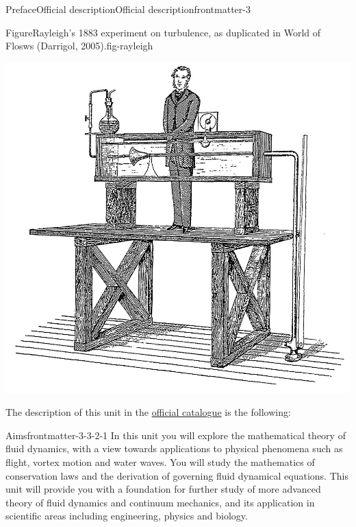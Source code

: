 \documentclass[oneside,10pt,]{book}
\numberwithin{equation}{section}
\begin{document}
\begin{preface}{Preface}{Official description}{}{Official description}{}{}{frontmatter-3}
\begin{figureptx}{Figure}{Rayleigh's 1883 experiment on turbulence, as duplicated in World of Flosws (Darrigol, 2005).}{fig-rayleigh}{}%
\begin{image}{0.1}{0.8}{0.1}{}%
\includegraphics[width=\linewidth]{external/rayleigh_tubulence.jpg}
\end{image}%
\tcblower
\end{figureptx}%
%
\par
The description of this unit in the \href{http://www.bath.ac.uk/catalogues/2025-2026/ma/MA32051.html}{official catalogue} is the following:%
\begin{descriptionlist}
\begin{dlinarrow}{Aims}{frontmatter-3-3-2-1}%
In this unit you will explore the mathematical theory of fluid dynamics, with a view towards applications to physical phenomena such as flight, vortex motion and water waves. You will study the mathematics of conservation laws and the derivation of governing fluid dynamical equations. This unit will provide you with a foundation for further study of more advanced theory of fluid dynamics and continuum mechanics, and its application in scientific areas including engineering, physics and biology.%
\end{dlinarrow}%

\end{descriptionlist}
\end{preface}
\end{document}
